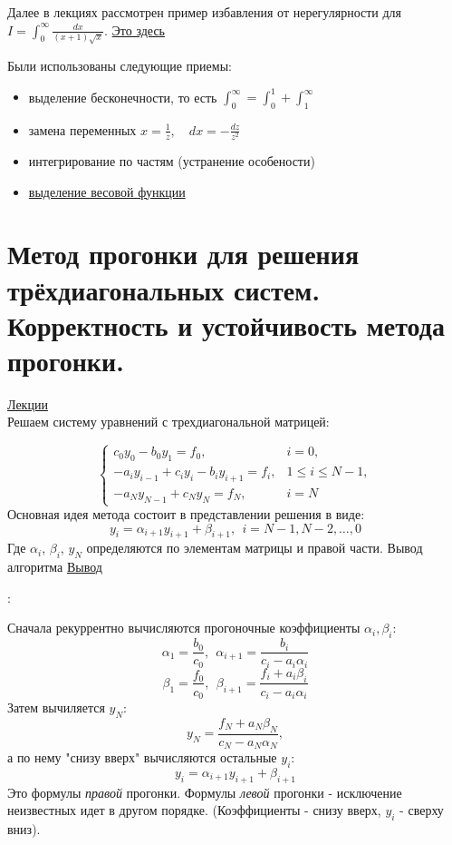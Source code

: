\documentclass[specialist, subf, href, colorlinks=true, 12pt, times, mtpro, final]{disser}
\theoremstyle{definition}
\begin{document}
    Далее в лекциях рассмотрен пример избавления от нерегулярности для $I = \int_0^{\infty} \frac{dx}{(x+1)\sqrt{x}}$. \hyperlink {lects.45}{Это здесь}
    
    Были использованы следующие приемы:
    \begin{itemize}
        \item выделение бесконечности, то есть $\int_0^{\infty} = \int_0^1 + \int_1^{\infty}$
        \item замена переменных $x = \frac{1}{z}, \quad dx = -\frac{dz}{z^2}$
        \item интегрирование по частям (устранение особености)
        \item \hyperlink {lects.46}{выделение весовой функции}
        
    \end{itemize}
    
\section {Метод прогонки для решения трёхдиагональных систем. Корректность и устойчивость метода прогонки.}
    \hyperlink {lects.48}{Лекции}\\
    Решаем систему уравнений с трехдиагональной матрицей:
    
    \begin{equation*}
     \begin{cases}
       c_0 y_0 - b_0 y_1 = f_0, &i = 0,\\
       -a_i y_{i-1} + c_i y_i - b_i y_{i+1} = f_i, &1 \le i \le N-1, \\
       -a_N y_{N-1} + c_N y_N = f_N, & i = N
     \end{cases}
    \end{equation*}
    Основная идея метода состоит в представлении решения в виде:
    $$y_i = \alpha_{i+1} y_{i+1} + \beta_{i+1}, \ \ i = N-1, N-2, \dots , 0$$
    Где $\alpha_i$, $\beta_i$, $y_N$ определяются по элементам матрицы и правой части.
    Вывод алгоритма \hyperlink {lects.48}{Вывод}
    
    :
    
    Сначала рекуррентно вычисляются прогоночные коэффициенты $\alpha_i, \beta_i$:
    $$
       \alpha_1 = \frac{b_0}{c_0}, \ \ \alpha_{i+1} = \frac{b_i}{c_i - a_i \alpha_i}
    $$
    $$
       \beta_1 = \frac{f_0}{c_0}, \ \ \beta_{i+1} = \frac{f_i + a_i \beta_i}{c_i - a_i \alpha_i}
    $$
    Затем вычиляется $y_N$:
    $$
       y_N = \frac{f_N + a_N \beta_N}{c_N - a_N \alpha_N},
    $$
    а по нему "снизу вверх" вычисляются остальные $y_i$:
    $$
       y_i = \alpha_{i+1} y_{i+1} + \beta_{i+1}
    $$
    Это формулы \emph{правой} прогонки. Формулы \emph{левой} прогонки - исключение неизвестных идет в другом порядке. (Коэффициенты - снизу вверх, $y_i$ - сверху вниз).
\end{document}
